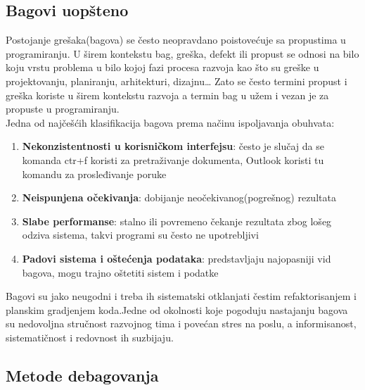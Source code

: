 \documentclass[a4paper]{article}
\begin{document}
\subsection{Bagovi uopšteno}
\label{subsec:podnaslov1}

Postojanje grešaka(bagova) se često neopravdano poistovećuje sa propustima u programiranju.
U širem kontekstu bag, greška, defekt ili propust se odnosi na bilo koju vrstu problema u bilo kojoj fazi procesa razvoja kao što su greške u projektovanju, planiranju, arhitekturi, dizajnu…
Zato se često termini propust i greška koriste u širem kontekstu razvoja a termin bag u užem i vezan je za propuste u programiranju.\\
\indent Jedna od najčešćih klasifikacija bagova prema načinu ispoljavanja obuhvata:
\begin{enumerate}
	\item \textbf{Nekonzistentnosti u korisničkom interfejsu}: često je slučaj da se komanda ctr+f koristi za pretraživanje dokumenta, Outlook koristi   
	tu komandu za prosleđivanje poruke
	\item \textbf{Neispunjena očekivanja}: dobijanje neočekivanog(pogrešnog) rezultata
	\item \textbf{Slabe performanse}: stalno ili povremeno čekanje rezultata zbog lošeg odziva sistema, takvi programi su često ne upotrebljivi
	\item \textbf{Padovi sistema i oštećenja podataka}: predstavljaju najopasniji vid bagova, mogu trajno oštetiti sistem i podatke
\end{enumerate}
\indent Bagovi su jako neugodni i treba ih sistematski otklanjati čestim refaktorisanjem i planskim gradjenjem koda.Jedne od okolnosti koje pogoduju nastajanju bagova su nedovoljna stručnost razvojnog tima i povećan stres na poslu, a informisanost, sistematičnost i redovnost ih suzbijaju. \cite{bagovi_smalkov}


\subsection{Metode debagovanja}
\label{subsec:podnaslov2}
\end{document}
